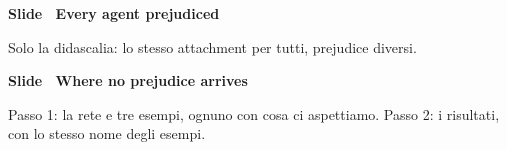 \par\addvspace{14pt}\noindent\begin{minipage}{\textwidth}
{\color{unipd}\bfseries Slide  \textperiodcentered\ Every agent prejudiced}\par\smallskip
{\small Solo la didascalia: lo stesso attachment per tutti, prejudice diversi.}\par\smallskip
\noindent\begin{minipage}[t]{0.36\textwidth}\par
{}\par\smallskip
\end{minipage}\hfill\begin{minipage}[t]{0.61\textwidth}\par
{}\par\smallskip
\end{minipage}\par
\end{minipage}\par
\par\addvspace{14pt}\noindent\begin{minipage}{\textwidth}
{\color{unipd}\bfseries Slide  \textperiodcentered\ Where no prejudice arrives}\par\smallskip
{\small Passo 1: la rete e tre esempi, ognuno con cosa ci aspettiamo. Passo 2: i risultati, con lo stesso nome degli esempi.}\par\smallskip
\noindent\begin{minipage}[t]{0.36\textwidth}\par
{}\par\smallskip
{}\par\smallskip
\end{minipage}\hfill\begin{minipage}[t]{0.61\textwidth}\par
{}\par\smallskip
{}\par\smallskip
\end{minipage}\par
\end{minipage}\par
